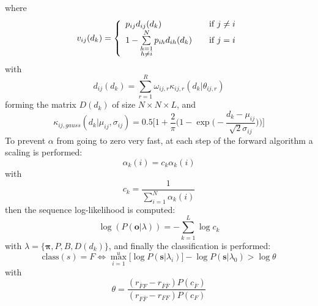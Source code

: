 \documentclass[12pt]{article} %
\begin{document}
where
\begin{equation}
    v_{ij}(d_k) = \left\{
        \begin{array}{l l}
            p_{ij} d_{ij}(d_k)
                & \quad \text{if $j \neq i$}\\
            1 - \sum\limits_{\substack{h=1 \\ h \neq i}}^{N} p_{ih} d_{ih}(d_k)
                & \quad \text{if $j = i$}
        \end{array} \right.
\end{equation}
with
\begin{equation}
    d_{ij}(d_k) = \sum_{r=1}^{R} \omega_{ij,r}\kappa_{ij,r}(d_k|\theta_{ij, r})
\end{equation}
forming the matrix $ D(d_k) $ of size $ N \times N \times L $, and
\begin{equation}
    \kappa_{ij, gauss}(d_k | \mu_{ij}, \sigma_{ij}) = 
        0.5\bigg [1 + \frac{2}{\pi}\Big (
            1 - \exp \big (-\frac{d_k - \mu_{ij}}{\sqrt 2 \sigma_{ij}}\big )
        \Big ) \bigg ]
\end{equation}
To prevent $ \alpha $ from going to zero very fast, at each step of the forward
algorithm a scaling is performed:
\begin{equation}
    \alpha_k(i) = c_k \alpha_k(i)
\end{equation}
with
\begin{equation}
    c_k = \frac{1}{\sum\limits_{i=1}^{N} \alpha_k(i)}
\end{equation}
then the sequence log-likelihood is computed:
\begin{equation}
    \log(P(\boldsymbol{o}|\lambda)) = -\sum\limits_{k=1}^{L} \log c_k
\end{equation}
with $ \lambda = \{\boldsymbol{\pi}, P, B, D(d_k) \} $,  and finally the
classification is performed:
\begin{equation}
    \text{class}(s) = F \iff \max_{i=1}^{u} \big [
        \log P(\boldsymbol{s}|\lambda_i)
    \big ] - \log P(\boldsymbol{s}|\lambda_0) > \log \theta
\end{equation}
with
\begin{equation}
    \theta = \frac{(r_{\bar{F}F} - r_{\bar{F}\bar{F}})P(c_{\bar{F}})}
        {(r_{F \bar{F}} - r_{FF})P(c_{F})}
\end{equation}
\end{document}
